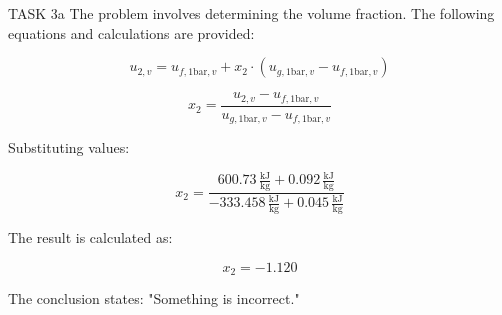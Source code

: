 TASK 3a  
The problem involves determining the volume fraction. The following equations and calculations are provided:

\[
u_{2,v} = u_{f,1\text{bar},v} + x_2 \cdot (u_{g,1\text{bar},v} - u_{f,1\text{bar},v})
\]

\[
x_2 = \frac{u_{2,v} - u_{f,1\text{bar},v}}{u_{g,1\text{bar},v} - u_{f,1\text{bar},v}}
\]

Substituting values:

\[
x_2 = \frac{600.73 \, \frac{\text{kJ}}{\text{kg}} + 0.092 \, \frac{\text{kJ}}{\text{kg}}}{-333.458 \, \frac{\text{kJ}}{\text{kg}} + 0.045 \, \frac{\text{kJ}}{\text{kg}}}
\]

The result is calculated as:

\[
x_2 = -1.120
\]

The conclusion states:  
"Something is incorrect."